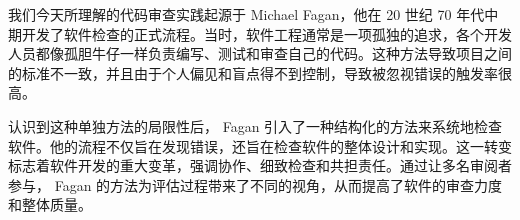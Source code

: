 我们今天所理解的代码审查实践起源于 Michael Fagan，他在 20 世纪 70 年代中期开发了软件检查的正式流程。当时，软件工程通常是一项孤独的追求，各个开发人员都像孤胆牛仔一样负责编写、测试和审查自己的代码。这种方法导致项目之间的标准不一致，并且由于个人偏见和盲点得不到控制，导致被忽视错误的触发率很高。

认识到这种单独方法的局限性后， Fagan 引入了一种结构化的方法来系统地检查软件。他的流程不仅旨在发现错误，还旨在检查软件的整体设计和实现。这一转变标志着软件开发的重大变革，强调协作、细致检查和共担责任。通过让多名审阅者参与， Fagan 的方法为评估过程带来了不同的视角，从而提高了软件的审查力度和整体质量。























